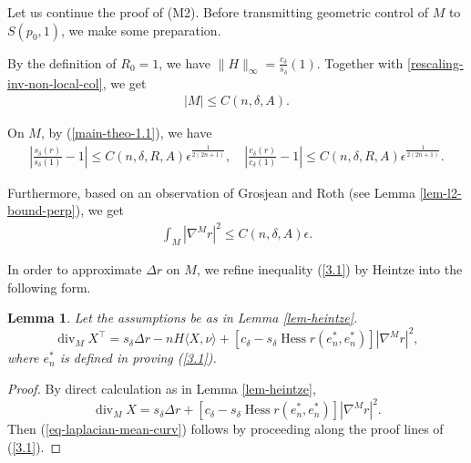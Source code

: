 \documentclass{amsart}
\numberwithin{equation}{section}
\newtheorem{lem}[theo]{Lemma}
\theoremstyle{remark}
\renewcommand{\(}{\left(}
\renewcommand{\)}{\right)}
\renewcommand{\~}{\tilde}
\renewcommand{\-}{\overline}
\renewcommand{\d}{\delta}
\newcommand{\e}{\epsilon}
\newcommand{\divv}{\operatorname{div }}
\begin{document}
Let us continue the proof of (M2). Before transmitting geometric control of $M$ to $S(p_0,1)$, we make some preparation.

By the definition of $R_0=1$, we have $\|H\|_\infty=\frac{c_\d}{s_\d}(1)$. Together with \eqref{rescaling-inv-non-local-col}, we get
\begin{align}\label{uniform-upper-bound-area}
|M| \leq C(n,\d,A). 
\end{align} 

On $M$, by (\ref{main-theo-1.1}), we have
\begin{align}\label{r-Linfty-estimate}
\left|\frac{s_{\d}(r)}{s_\d(1)}-1 \right| \leq C(n,\d,R,A)\e^\frac{1}{2(2n+1)}, \quad \left|\frac{c_{\d}(r)}{c_\d(1)}-1 \right| \leq C(n,\d,R,A)\e^\frac{1}{2(2n+1)}.
\end{align}

Furthermore, based on an observation of Grosjean and Roth \cite[Proposition 2.1]{Grosjean-Roth2012} (see Lemma \ref{lem-l2-bound-perp}), we get
\begin{align}\label{nabla-r-L2-estimate}
\int_{M}|\nabla^{M}r|^2  \leq C(n,\d,A) \e.
\end{align}

In order to approximate $\Delta r$ on $M$, we refine inequality (\ref{3.1}) by Heintze into the following form.

\begin{lem}\label{lem-refine-heintze}
	Let the assumptions be as in Lemma \ref{lem-heintze}.
	\begin{equation}\label{eq-laplacian-mean-curv}
	\divv_MX^\top=s_\d \Delta r-nH\langle  X,\nu\rangle +\left[c_\d-s_\d \operatorname{Hess}r(e_n^*,e_n^*)\right]|\nabla^M r|^2,
	\end{equation}
	where $e_n^*$ is defined in proving (\ref{3.1}).
\end{lem}
\begin{proof}
	By direct calculation as in Lemma \ref{lem-heintze},
	$$\divv_MX=s_\d \Delta r+\left[c_\d-s_\d \operatorname{Hess}r(e_n^*,e_n^*)\right]|\nabla^M r|^2.$$
	Then (\ref{eq-laplacian-mean-curv}) follows by proceeding along the proof lines of (\ref{3.1}).
\end{proof}
\end{document}
